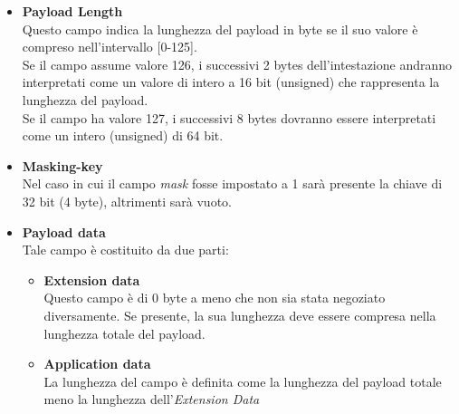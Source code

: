\documentclass[
  oneside,
  11pt, a4paper,
  footinclude=true,
  headinclude=true,
  cleardoublepage=empty
]{scrbook}
\begin{document}
\begin{itemize}
  \item \textbf{Payload Length}\\
  Questo campo indica la lunghezza del payload in byte se il suo valore è compreso nell'intervallo [0-125].\\Se il campo assume valore 126, i successivi 2 bytes dell'intestazione andranno interpretati come un valore di intero a 16 bit (unsigned) che rappresenta la lunghezza del payload.\\
  Se il campo ha valore 127, i successivi 8 bytes dovranno essere interpretati come un intero (unsigned) di 64 bit.
  \item \textbf{Masking-key}\\
  Nel caso in cui il campo \textit{mask} fosse impostato a 1 sarà presente la chiave di 32 bit (4 byte), altrimenti sarà vuoto.
  \item \textbf{Payload data}\\
  Tale campo è costituito da due parti:
  \begin{itemize}
    \item \textbf{Extension data}\\
    Questo campo è di 0 byte a meno che non sia stata negoziato diversamente. Se presente, la sua lunghezza deve essere compresa nella lunghezza totale del payload.
    \item \textbf{Application data}\\
    La lunghezza del campo è definita come la lunghezza del payload totale meno la lunghezza dell'\textit{Extension Data}
  \end{itemize}
\end{itemize}
\end{document}
